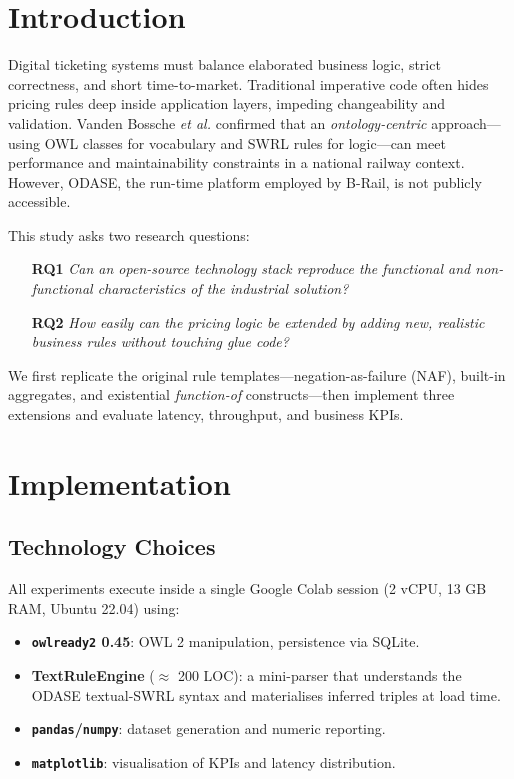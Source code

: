 \documentclass[lettersize,journal]{IEEEtran}
\begin{document}
\section{Introduction}
Digital ticketing systems must balance elaborated business logic, strict correctness, and short time-to-market.  
Traditional imperative code often hides pricing rules deep inside application layers, impeding changeability and validation.  
Vanden Bossche \textit{et al.} \cite{ruleml24} confirmed that an \emph{ontology-centric} approach—using OWL classes for vocabulary and SWRL rules for logic—can meet performance and maintainability constraints in a national railway context.  
However, ODAS\!E, the run-time platform employed by B-Rail, is not publicly accessible.

This study asks two research questions:

\begin{enumerate}
\item[\textbf{RQ1}] \textit{Can an open-source technology stack reproduce the functional and non-functional characteristics of the industrial solution?}
\item[\textbf{RQ2}] \textit{How easily can the pricing logic be extended by adding new, realistic business rules without touching glue code?}
\end{enumerate}

We first replicate the original rule templates—negation-as-failure (NAF), built-in aggregates, and existential \emph{function-of} constructs—then implement three extensions and evaluate latency, throughput, and business KPIs.

\section{Implementation}
\subsection{Technology Choices}
All experiments execute inside a single Google Colab session (2 vCPU, 13 GB RAM, Ubuntu 22.04) using:

\begin{itemize}
\item \textbf{\texttt{owlready2} 0.45}: OWL 2 manipulation, persistence via SQLite.
\item \textbf{TextRuleEngine} ($\approx$ 200 LOC): a mini-parser that understands the ODAS\!E textual-SWRL syntax and materialises inferred triples at load time.
\item \textbf{\texttt{pandas}/\texttt{numpy}}: dataset generation and numeric reporting.
\item \textbf{\texttt{matplotlib}}: visualisation of KPIs and latency distribution.
\end{itemize}
\end{document}
